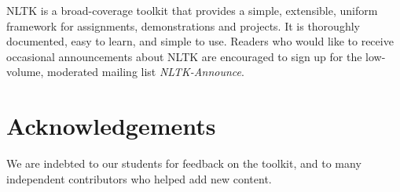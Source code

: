 \documentclass[11pt]{article}
\begin{document}
NLTK is a broad-coverage toolkit that provides a simple, extensible,
uniform framework for assignments, demonstrations and projects.  It is
thoroughly documented, easy to learn, and simple to use.  Readers who
would like to receive occasional announcements about NLTK are
encouraged to sign up for the low-volume, moderated mailing list
\textit{NLTK-Announce}.

\section{Acknowledgements}

We are indebted to our students for feedback on the toolkit, and to
many independent contributors who helped add new content.



\end{document}

